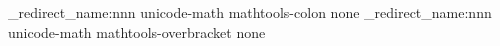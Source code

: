 \newcommand{\thesisboldmath}{\bm} %
\ifthesisotfmath
\ExplSyntaxOn
\msg_redirect_name:nnn { unicode-math } { mathtools-colon } { none }
\msg_redirect_name:nnn { unicode-math } { mathtools-overbracket } { none }
\ExplSyntaxOff
\fi
\ifthesismathtime
\edef\thesis@tmp{\noexpand\RequirePackage[ntxcal, textsf, scale=\thesis@fontscale]{mtpro2-otf}}\thesis@tmp
\edef\thesismathtimeedition{\MTPOTFedition}
\else\ifthesisntxotf
